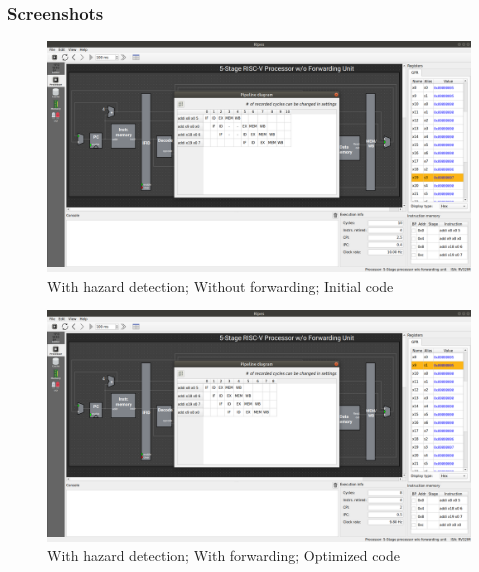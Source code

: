 \documentclass[12pt, fleqn]{article}
\begin{document}
\subsubsection*{Screenshots}
\begin{figure}[H]
  \centering
  \includegraphics[scale=0.25]{Q2/b_init_hnf_end_pipeline.png}
  \caption{With hazard detection; Without forwarding; Initial code}
\end{figure}
\begin{figure}[H]
  \centering
  \includegraphics[scale=0.25]{Q2/b_opt_hnf_end_pipeline.png}
  \caption{With hazard detection; With forwarding; Optimized code}
\end{figure}
\end{document}
